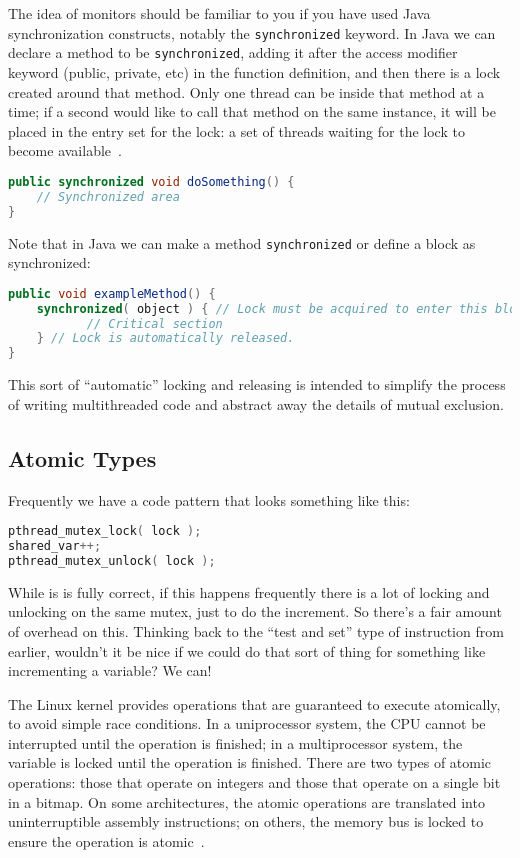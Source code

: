 The idea of monitors should be familiar to you if you have used Java synchronization constructs, notably the \texttt{synchronized} keyword. In Java we can declare a method to be \texttt{synchronized}, adding it after the access modifier keyword (public, private, etc) in the function definition, and then there is a lock created around that method. Only one thread can be inside that method at a time; if a second would like to call that method on the same instance, it will be placed in the entry set for the lock: a set of threads waiting for the lock to become available~\cite{osc}. 

\begin{lstlisting}[language=Java]
public synchronized void doSomething() {
    // Synchronized area
}
\end{lstlisting}


Note that in Java we can make a method \texttt{synchronized} or define a block as synchronized:

\begin{lstlisting}[language=Java]
public void exampleMethod() {
    synchronized( object ) { // Lock must be acquired to enter this block
           // Critical section 
    } // Lock is automatically released.
}
\end{lstlisting}

This sort of ``automatic'' locking and releasing is intended to simplify the process of writing multithreaded code and abstract away the details of mutual exclusion.

\subsection*{Atomic Types}

Frequently we have a code pattern that looks something like this:

\begin{lstlisting}[language=C]
pthread_mutex_lock( lock );
shared_var++;
pthread_mutex_unlock( lock );
\end{lstlisting}

While is is fully correct, if this happens frequently there is a lot of locking and unlocking on the same mutex, just to do the increment. So there's a fair amount of overhead on this. Thinking back to the ``test and set'' type of instruction from earlier, wouldn't it be nice if we could do that sort of thing for something like incrementing a variable? We can! 

The Linux kernel provides operations that are guaranteed to execute atomically, to avoid simple race conditions. In a uniprocessor system, the CPU cannot be interrupted until the operation is finished; in a multiprocessor system, the variable is locked until the operation is finished. There are two types of atomic operations: those that operate on integers and those that operate on a single bit in a bitmap. On some architectures, the atomic operations are translated into uninterruptible assembly instructions; on others, the memory bus is locked to ensure the operation is atomic~\cite{osi}.

